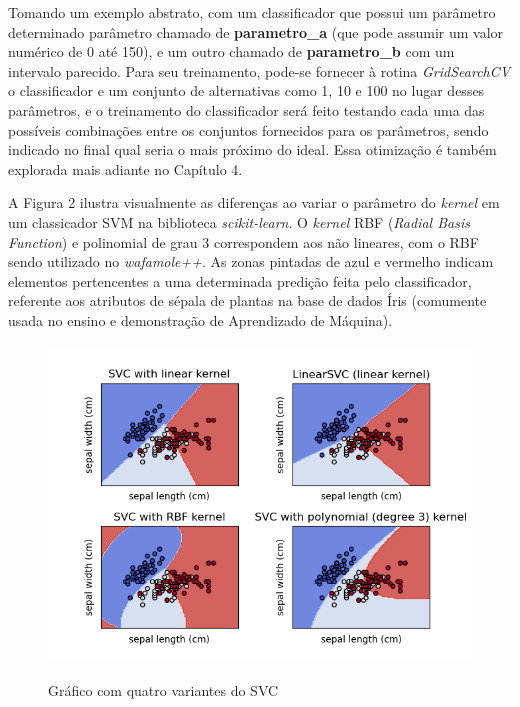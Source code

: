 Tomando um exemplo abstrato, com um classificador que possui um parâmetro determinado parâmetro chamado de \textbf{parametro\_a} (que pode assumir um valor numérico de 0 até 150), e um outro chamado de \textbf{parametro\_b} com um intervalo parecido. Para seu treinamento, pode-se fornecer à rotina \textit{GridSearchCV} o classificador e um conjunto de alternativas como 1, 10 e 100 no lugar desses parâmetros, e o treinamento do classificador será feito testando cada uma das possíveis combinações entre os conjuntos fornecidos para os parâmetros, sendo indicado no final qual seria o mais próximo do ideal. Essa otimização é também explorada mais adiante no Capítulo 4.

A Figura 2 ilustra visualmente as diferenças ao variar o parâmetro do \textit{kernel} em um classicador SVM na biblioteca \textit{scikit-learn}. O \textit{kernel} RBF (\textit{Radial Basis Function}) e polinomial de grau 3 correspondem aos não lineares, com o RBF sendo utilizado no \textit{wafamole++}. As zonas pintadas de azul e vermelho indicam elementos pertencentes a uma determinada predição feita pelo classificador, referente aos atributos de sépala de plantas na base de dados Íris (comumente usada no ensino e demonstração de Aprendizado de Máquina).

\begin{figure}[H]
    \centering
    \caption{Gráfico com quatro variantes do SVC}
    \includegraphics[width=14cm]{figuras/plot-svc.png} 
    \label{fig:internet} 
\end{figure}


